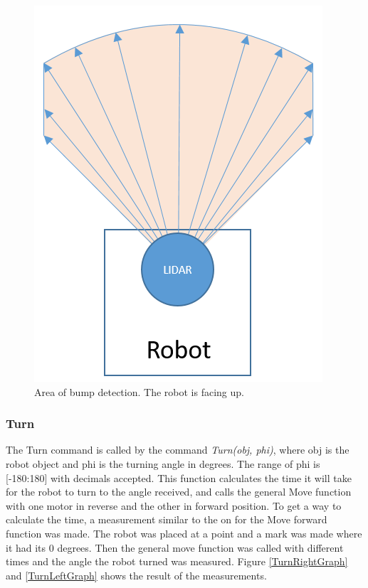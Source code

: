 \begin{figure}[H]
\centering
\includegraphics[scale=0.7]{billeder/MotionBumper.png}
\caption{Area of bump detection. The robot is facing up.}\label{MotionBumper}
\end{figure} 

\subsubsection{Turn}
The Turn command is called by the command \textit{Turn(obj, phi)}, where obj is the robot object and phi is the turning angle in degrees. The range of phi is [-180:180] with decimals accepted. This function calculates the time it will take for the robot to turn to the angle received, and calls the general Move function with one motor in reverse and the other in forward position. 
To get a way to calculate the time, a measurement similar to the on for the Move forward function was made. The robot was placed at a point and a mark was made where it had its 0 degrees. Then the general move function was called with different times and the angle the robot turned was measured. Figure \ref{TurnRightGraph} and \ref{TurnLeftGraph} shows the result of the measurements.

